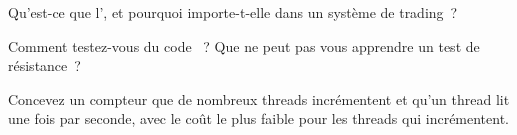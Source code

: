 \begin{interviewq}\label{iq:ll:lock-free-programming:4}
Qu'est-ce que l', et pourquoi importe-t-elle dans un système de trading~?
\end{interviewq}

\begin{interviewq}\label{iq:ll:lock-free-programming:5}
Comment testez-vous du code ~? Que ne peut pas vous apprendre un test de résistance~?
\end{interviewq}

\begin{interviewq}\label{iq:ll:lock-free-programming:6}
Concevez un compteur que de nombreux threads incrémentent et qu'un thread lit une fois par seconde, avec le coût le plus faible
pour les threads qui incrémentent.
\end{interviewq}
